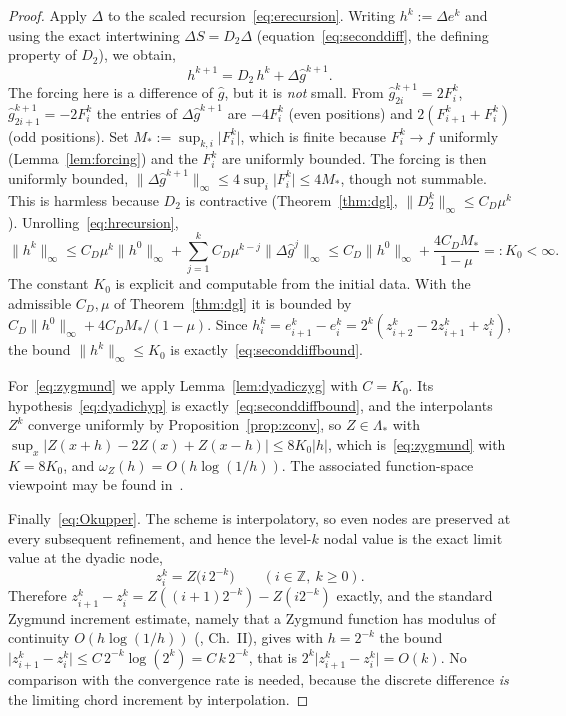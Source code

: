 \documentclass{article}
\theoremstyle{plain}
\theoremstyle{definition}
\newcommand{\Z}{\mathbb{Z}}
\newcommand{\norm}[1]{\lVert #1 \rVert}
\newcommand{\abs}[1]{\lvert #1 \rvert}
\begin{document}
\begin{proof}
Apply $\Delta$ to the scaled recursion~\eqref{eq:erecursion}. Writing
$h^k:=\Delta e^k$ and using the exact intertwining $\Delta S=D_2\Delta$
(equation~\eqref{eq:seconddiff}, the defining property of $D_2$), we obtain,
\begin{equation}\label{eq:hrecursion}
  h^{k+1} = D_2\,h^{k} + \Delta\hat g^{k+1}.
\end{equation}
The forcing here is a difference of $\hat g$, but it is \emph{not} small. From
$\hat g_{2i}^{k+1}=2F_i^k$, $\hat g_{2i+1}^{k+1}=-2F_i^k$ the entries of
$\Delta\hat g^{k+1}$ are $-4F_i^k$ (even positions) and $2(F_{i+1}^k+F_i^k)$
(odd positions). Set $M_*:=\sup_{k,i}\abs{F_i^k}$, which is finite because
$F_i^k\to f$ uniformly (Lemma~\ref{lem:forcing}) and the $F_i^k$ are uniformly
bounded. The forcing is then uniformly bounded,
$\norm{\Delta\hat g^{k+1}}_\infty\leq 4\sup_i\abs{F_i^k}\leq 4M_*$, though not
summable. This is harmless because $D_2$ is contractive (Theorem~\ref{thm:dgl},
$\norm{D_2^k}_\infty\leq C_D\mu^k$). Unrolling~\eqref{eq:hrecursion},
\[
  \norm{h^k}_\infty
  \leq C_D\mu^k\norm{h^0}_\infty
   + \sum_{j=1}^{k} C_D\mu^{k-j}\norm{\Delta\hat g^{j}}_\infty
  \leq C_D\norm{h^0}_\infty + \frac{4 C_D M_*}{1-\mu}=:K_0<\infty.
\]
The constant $K_0$ is explicit and computable from the initial data. With the
admissible $C_D,\mu$ of Theorem~\ref{thm:dgl} it is bounded by
$C_D\norm{h^0}_\infty+4C_D M_*/(1-\mu)$.
Since $h_i^k=e_{i+1}^k-e_i^k=2^k(z_{i+2}^k-2z_{i+1}^k+z_i^k)$, the bound
$\norm{h^k}_\infty\leq K_0$ is exactly~\eqref{eq:seconddiffbound}.

For~\eqref{eq:zygmund} we apply Lemma~\ref{lem:dyadiczyg} with $C=K_0$. Its
hypothesis~\eqref{eq:dyadichyp} is exactly~\eqref{eq:seconddiffbound}, and the
interpolants $Z^k$ converge uniformly by Proposition~\ref{prop:zconv}, so
$Z\in\Lambda_*$ with $\sup_x\abs{Z(x+h)-2Z(x)+Z(x-h)}\le 8K_0\abs h$, which
is~\eqref{eq:zygmund} with $K=8K_0$, and $\omega_Z(h)=O(h\log(1/h))$. The
associated function-space viewpoint may be found in~\cite{CMS85, Meyer92}.

Finally~\eqref{eq:Okupper}. The scheme is interpolatory, so even nodes are
preserved at every subsequent refinement, and hence the level-$k$ nodal value is
the exact limit value at the dyadic node,
\begin{equation}\label{eq:nodalupper}
  z_i^k=Z\bigl(i\,2^{-k}\bigr)\qquad(i\in\Z,\ k\ge0).
\end{equation}
Therefore $z_{i+1}^k-z_i^k=Z((i+1)2^{-k})-Z(i2^{-k})$ exactly, and the standard
Zygmund increment estimate, namely that a Zygmund function has modulus of
continuity $O(h\log(1/h))$ (\cite{Zygmund}, Ch.~II), gives with $h=2^{-k}$ the
bound $\abs{z_{i+1}^k-z_i^k}\le C\,2^{-k}\log(2^{k})=C\,k\,2^{-k}$, that is
$2^k\abs{z_{i+1}^k-z_i^k}=O(k)$. No comparison with the convergence rate is
needed, because the discrete difference \emph{is} the limiting chord increment by
interpolation.
\end{proof}
\end{document}
